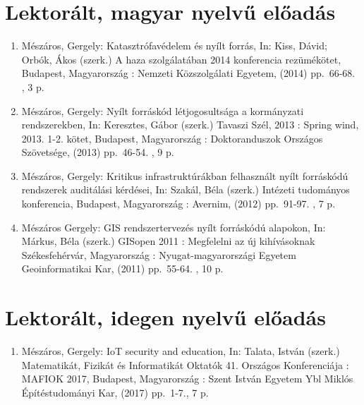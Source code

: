 \documentclass[12pt,magyar,a4paper,oneside]{scrreprt}
\providecommand{\tightlist}{%
  \setlength{\itemsep}{0pt}\setlength{\parskip}{0pt}}
\begin{document}
\hypertarget{lektoruxe1lt-magyar-nyelvux171-elux151aduxe1s}{%
\section*{Lektorált, magyar nyelvű
előadás}\label{lektoruxe1lt-magyar-nyelvux171-elux151aduxe1s}}

\begin{enumerate}
\def\labelenumi{\arabic{enumi}.}
\item
  Mészáros, Gergely: Katasztrófavédelem és nyílt forrás, In: Kiss,
  Dávid; Orbók, Ákos (szerk.) A haza szolgálatában 2014 konferencia
  rezümékötet, Budapest, Magyarország : Nemzeti Közszolgálati Egyetem,
  (2014) pp.~66-68. , 3 p.
\item
  Mészáros, Gergely: Nyílt forráskód létjogosultsága a kormányzati
  rendszerekben, In: Keresztes, Gábor (szerk.) Tavaszi Szél, 2013 :
  Spring wind, 2013. 1-2. kötet, Budapest, Magyarország : Doktoranduszok
  Országos Szövetsége, (2013) pp.~46-54. , 9 p.
\item
  Mészáros, Gergely: Kritikus infrastruktúrákban felhasznált nyílt
  forráskódú rendszerek auditálási kérdései, In: Szakál, Béla (szerk.)
  Intézeti tudományos konferencia, Budapest, Magyarország : Avernim,
  (2012) pp.~91-97. , 7 p.
\item
  Mészáros Gergely: GIS rendszertervezés nyílt forráskódú alapokon, In:
  Márkus, Béla (szerk.) GISopen 2011 : Megfelelni az új kihívásoknak
  Székesfehérvár, Magyarország : Nyugat-magyarországi Egyetem
  Geoinformatikai Kar, (2011) pp.~55-64. , 10 p.
\end{enumerate}

\hypertarget{lektoruxe1lt-idegen-nyelvux171-elux151aduxe1s}{%
\section*{Lektorált, idegen nyelvű
előadás}\label{lektoruxe1lt-idegen-nyelvux171-elux151aduxe1s}}

\begin{enumerate}
\def\labelenumi{\arabic{enumi}.}
\tightlist
\item
  Mészáros, Gergely: IoT security and education, In: Talata, István
  (szerk.) Matematikát, Fizikát és Informatikát Oktatók 41. Országos
  Konferenciája : MAFIOK 2017, Budapest, Magyarország : Szent István
  Egyetem Ybl Miklós Építéstudományi Kar, (2017) pp.~1-7., 7 p.
\end{enumerate}
\end{document}
